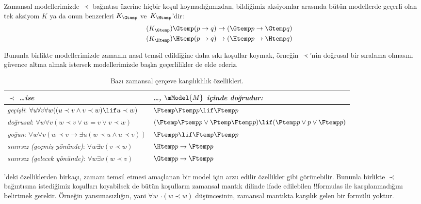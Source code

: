 \documentclass[../../../include/open-logic-section]{subfiles}
\begin{document}


Zamansal modellerimizde $\prec$ bağıntısı üzerine hiçbir koşul
koymadığımızdan, bildiğimiz aksiyomlar arasında bütün modellerde geçerli olan
tek aksiyom $K$ ya da onun benzerleri $K_{\Gtemp}$ ve~$K_{\Htemp}$'dir:
\begin{align*}
\tag{$K_{\Gtemp}$}  \Gtemp (p \to q) & \to (\Gtemp p \to \Gtemp q)\\
\tag{$K_{\Htemp}$}  \Htemp (p \to q) & \to (\Htemp p \to \Htemp q)
\end{align*}

Bununla birlikte modellerimizde zamanın nasıl temsil edildiğine daha sıkı
koşullar koymak, örneğin $\prec$'nin doğrusal bir sıralama olmasını güvence
altına almak istersek modellerimizde başka geçerlilikler de elde ederiz.

\begin{table}[t]
  \begin{tabular}{| p{} || p{} |}
    \hline
    {\emph{$\prec$ \dots ise}} & {\emph{\dots, $\mModel{M}$ içinde doğrudur:}} \\
    \hline \hline
    \emph{geçişli}: \newline
    $\forall u \forall v \forall w ((u \prec v \land v \prec w) \lif u \prec w)$ & 
    $\Ftemp \Ftemp p \lif \Ftemp p$  \\
    \hline 
    \emph{doğrusal}: \newline
    $\forall w \forall v (w \prec v \lor w = v \lor v \prec w)$ &  
    $(\Ftemp \Ptemp p \lor \Ptemp \Ftemp p) \lif (\Ptemp p \lor p \lor \Ftemp p)$\\
    \hline
    \emph{yoğun}: \newline
    $\forall w \forall v (w \prec v \to \exists u(w \prec u \land u \prec v))$ &  
    $\Ftemp p \lif \Ftemp \Ftemp p$ \\
    \hline
    \emph{sınırsız (geçmiş yönünde)}: \newline
    $\forall w \exists v( v \prec w)$ &  
    $\Htemp p \to \Ptemp p$ \\
    \hline
    \emph{sınırsız (gelecek yönünde)}: \newline
    $\forall w \exists v( w \prec v)$ &  
    $\Gtemp p \to \Ftemp p$ \\
    \hline
  \end{tabular}
  \caption{Bazı zamansal çerçeve karşılıklılık özellikleri.}
\end{table} 

'deki özelliklerden birkaçı, zamanı temsil etmesi
amaçlanan bir model için arzu edilir özellikler gibi görünebilir. Bununla
birlikte $\prec$ bağıntısına istediğimiz koşulları koyabilsek de bütün
koşulların zamansal mantık dilinde ifade edilebilen !!{formula}s ile
karşılanmadığını belirtmek gerekir. Örneğin yansımasızlığın, yani
$\forall w\lnot(w\prec w)$ düşüncesinin, zamansal mantıkta karşılık gelen
bir formülü yoktur.
\end{document}
